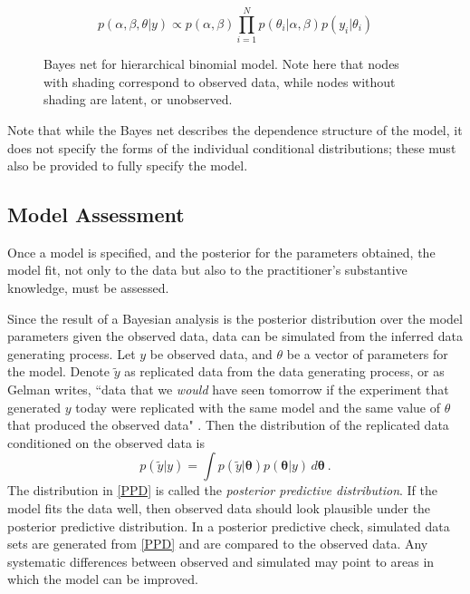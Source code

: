  \[ p(\alpha,\beta, \theta \vert y) \propto p(\alpha,\beta) \prod_{i = 1}^N p(\theta_i \vert \alpha, \beta) p(y_i\vert \theta_i)  \]

\begin{figure}[h!]

	\centering
	\caption[Hierarchical binomial model bayes net]{Bayes net for hierarchical binomial model.  Note here that nodes with shading correspond to observed data, while nodes without shading are latent, or unobserved.}
	\label{bayesnet}
\end{figure}

\noindent Note that while the Bayes net describes the dependence structure of the model, it does not specify the forms of the individual conditional distributions; these must also be provided to fully specify the model.

\subsection{Model Assessment}

Once a model is specified, and the posterior for the parameters obtained, the model fit, not only to the data but also to the practitioner's substantive knowledge, must be assessed.  

Since the result of a Bayesian analysis is the posterior distribution over the model parameters given the observed data, data can be simulated from the inferred data generating process.  Let $ y $ be observed data, and $ \theta $ be a vector of parameters for the model.  Denote $ \tilde{y} $ as replicated data from the data generating process, or as Gelman writes, ``data that we \textit{would} have seen tomorrow if the experiment that generated $ y $ today were replicated with the same model and the same value of $ \theta $ that produced the observed data" \cite[page~145]{gelman2013bayesian}.  Then the distribution of the replicated data conditioned on the observed data is 
%
\begin{equation}\label{PPD}
	p(\tilde{y} \vert y) = \int p(\tilde{y} \vert \bm{\theta}) p(\bm{\theta} \vert y) \, d\bm{\theta}  \>.
\end{equation}
%
The distribution in \cref{PPD} is called the \textit{posterior predictive distribution}.  If the model fits the data well, then observed data should look plausible under the posterior predictive distribution. In a posterior predictive check, simulated data sets are generated from \cref{PPD} and are compared to the observed data.  Any systematic differences between observed and simulated may point to areas in which the model can be improved.

